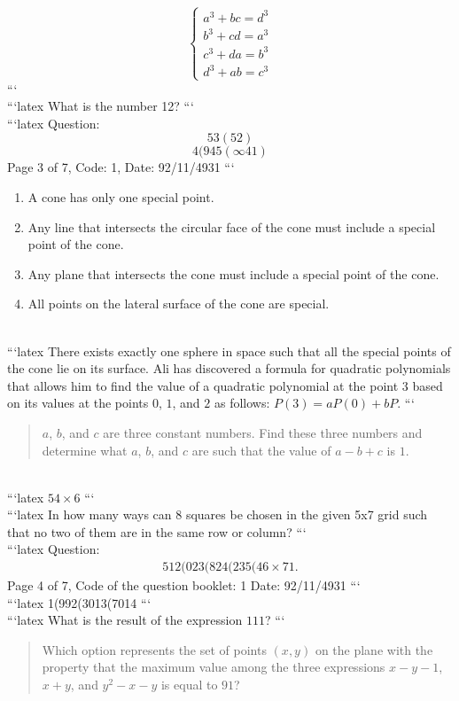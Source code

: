 \[
\begin{cases} 
a^3 + bc = d^3 \\
b^3 + cd = a^3 \\
c^3 + da = b^3 \\
d^3 + ab = c^3 
\end{cases}
\]
```
\\
```latex
What is the number 12?
```
\\
```latex
Question: 
$$53(52)$$ 
$$4(945(\infty 41)$$ 
Page 3 of 7, Code: 1, Date: 92/11/4931
```
\\
\begin{enumerate}
    \item A cone has only one special point.
    \item Any line that intersects the circular face of the cone must include a special point of the cone.
    \item Any plane that intersects the cone must include a special point of the cone.
    \item All points on the lateral surface of the cone are special.
\end{enumerate}
\\
```latex
There exists exactly one sphere in space such that all the special points of the cone lie on its surface. Ali has discovered a formula for quadratic polynomials that allows him to find the value of a quadratic polynomial at the point $3$ based on its values at the points $0$, $1$, and $2$ as follows: $P(3) = aP(0) + bP$.
```
\\
\begin{quote}
$a$, $b$, and $c$ are three constant numbers. Find these three numbers and determine what $a$, $b$, and $c$ are such that the value of $a - b + c$ is $1$.
\end{quote}
\\
```latex
$54 \times 6$
```
\\
```latex
In how many ways can 8 squares be chosen in the given 5x7 grid such that no two of them are in the same row or column?
```
\\
```latex
Question:
\begin{align*}
512(023(824(235(46 \times 71.
\end{align*}
Page 4 of 7, Code of the question booklet: 1
Date: 92/11/4931
```
\\
```latex
1(992(3013(7014
```
\\
```latex
What is the result of the expression \(111\)?
```
\\
\begin{quote}
Which option represents the set of points $(x, y)$ on the plane with the property that the maximum value among the three expressions $x - y - 1$, $x + y$, and $y^2 - x - y$ is equal to $91$?
\end{quote}
